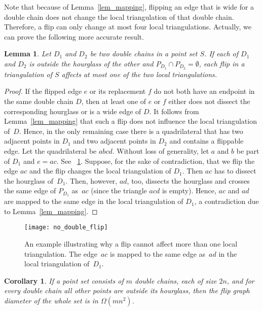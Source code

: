 \documentclass[11pt,a4paper]{article}
\newcommand{\myqed}{\qed}
\renewcommand{\myqed}{}
\newtheorem{lemma}[theorem]{Lemma}
\newtheorem{corollary}[theorem]{Corollary}
\begin{document}
Note that because of Lemma~\ref{lem_mapping}, flipping an edge that is wide for a double chain does not change the local triangulation of that double chain.
Therefore, a flip can only change at most four local triangulations.
Actually, we can prove the following more accurate result.

\begin{lemma}\label{lem_no_common_flip}
Let $D_1$ and $D_2$ be two double chains in a point set $S$.
If each of $D_1$ and $D_2$ is outside the hourglass of the other and $P_{D_1} \cap P_{D_2} = \emptyset$, each flip in a triangulation of $S$ affects at most one of the two local triangulations.
\end{lemma}
\begin{proof}
If the flipped edge $e$ or its replacement $f$ do not both have an endpoint in the same double chain $D$, then at least one of $e$ or $f$ either does not dissect the corresponding hourglass or is a wide edge of $D$.
It follows from Lemma~\ref{lem_mapping} that such a flip does not influence the local triangulation of~$D$.
Hence, in the only remaining case there is a quadrilateral that has two adjacent points in $D_\mathrm{1}$ and two adjacent points in $D_\mathrm{2}$ and contains a flippable edge.
Let the quadrilateral be $abcd$.
Without loss of generality, let $a$ and $b$ be part of $D_1$ and $e = ac$.
See \figurename~\ref{fig_no_double_flip}.
Suppose, for the sake of contradiction, that we flip the edge $ac$ and the flip changes the local triangulation of $D_\mathrm{1}$.
Then $ac$ has to dissect the hourglass of~$D_\mathrm{1}$.
Then, however, $ad$, too, dissects the hourglass and crosses the same edge of $P_{D_\mathrm{1}}$ as~$ac$ (since the triangle $acd$ is empty).
Hence, $ac$ and $ad$ are mapped to the same edge in the local triangulation of $D_\mathrm{1}$, a contradiction due to Lemma~\ref{lem_mapping}.
\myqed
\end{proof}

\begin{figure}
\centering
\texttt{[image: no\_double\_flip]}
\caption{An example illustrating why a flip cannot affect more than one local triangulation.
The edge~$ac$ is mapped to the same edge as~$ad$ in the local triangulation of~$D_1$.}
\label{fig_no_double_flip}
\end{figure}


\begin{corollary}\label{cor_distance}
If a point set consists of $m$ double chains, each of size $2n$, and for every double chain all other points are outside its hourglass, then the flip graph diameter of the whole set is in $\Omega(mn^2)$.
\end{corollary}
\end{document}
